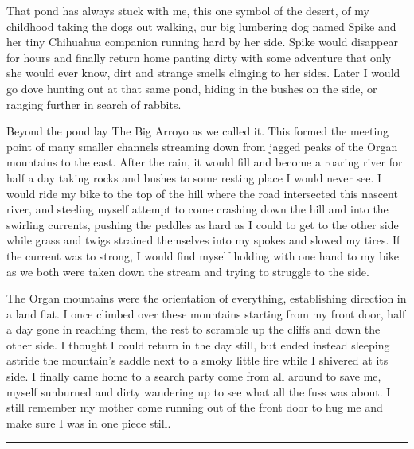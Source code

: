\documentclass[ebook, 10pt, openright, onecolumn]{memoir}
\newcommand*\td[1]{
  \todo[inline]{
     #1 
  }
}
\newcommand*\starbreak{\fancybreak*{\Large{* * *}}}
\newcommand*\finish{\td{ ----- Finish this section -----}}
\begin{document}
That pond has always stuck with me, this one symbol of the desert, of my
childhood taking the dogs out walking, our big lumbering dog named Spike and her
tiny Chihuahua companion running hard by her side.  Spike would disappear for
hours and finally return home panting dirty with some adventure that only she
would ever know, dirt and strange smells clinging to her sides.  Later I would
go dove hunting out at that same pond, hiding in the bushes on the side, or
ranging further in search of rabbits.

Beyond the pond lay The Big Arroyo as we called it.  This formed the meeting
point of many smaller channels streaming down from jagged peaks of the Organ
mountains to the east.  After the rain, it would fill and become a roaring river
for half a day taking rocks and bushes to some resting place I would never see.
I would ride my bike to the top of the hill where the road intersected this
nascent river, and steeling myself attempt to come crashing down the hill and
into the swirling currents, pushing the peddles as hard as I could to get to the
other side while grass and twigs strained themselves into my spokes and slowed
my tires.  If the current was to strong, I would find myself holding with one
hand to my bike as we both were taken down the stream and trying to struggle to
the side.

The Organ mountains were the orientation of everything, establishing direction
in a land flat.  I once climbed over these mountains starting from my front
door, half a day gone in reaching them, the rest to scramble up the cliffs and
down the other side.  I thought I could return in the day still, but ended
instead sleeping astride the mountain's saddle next to a smoky little fire while
I shivered at its side.  I finally came home to a search party come from all
around to save me, myself sunburned and dirty wandering up to see what all the
fuss was about.  I still remember my mother come running out of the front door
to hug me and make sure I was in one piece still.

\finish

\starbreak
\end{document}
